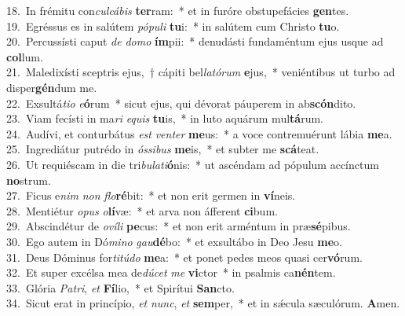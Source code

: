{18.~}In frémitu con\textit{cul}\textit{cá}\textit{bis} \textbf{ter}ram:~* et in furóre obstupefácies \textbf{gen}tes.\\
{19.~}Egréssus es in salútem \textit{pó}\textit{pu}\textit{li} \textbf{tu}i:~* in salútem cum Christo \textbf{tu}o.\\
{20.~}Percussísti caput \textit{de} \textit{do}\textit{mo} \textbf{ím}pii:~* denudásti fundaméntum ejus usque ad \textbf{col}lum.\\
{21.~}Maledixísti sceptris ejus,~† cápiti bel\textit{la}\textit{tó}\textit{rum} \textbf{e}jus,~* veniéntibus ut turbo ad disper\textbf{gén}dum me.\\
{22.~}Exsultá\textit{ti}\textit{o} \textit{e}\textbf{ó}rum~* sicut ejus, qui dévorat páuperem in ab\textbf{scón}dito.\\
{23.~}Viam fecísti in ma\textit{ri} \textit{e}\textit{quis} \textbf{tu}is,~* in luto aquárum mul\textbf{tá}rum.\\
{24.~}Audívi, et conturbátus \textit{est} \textit{ven}\textit{ter} \textbf{me}us:~* a voce contremuérunt lábia \textbf{me}a.\\
{25.~}Ingrediátur putrédo in \textit{ós}\textit{si}\textit{bus} \textbf{me}is,~* et subter me \textbf{scá}teat.\\
{26.~}Ut requiéscam in die tri\textit{bu}\textit{la}\textit{ti}\textbf{ó}nis:~* ut ascéndam ad pópulum accínctum \textbf{no}strum.\\
{27.~}Ficus e\textit{nim} \textit{non} \textit{flo}\textbf{ré}bit:~* et non erit germen in \textbf{ví}neis.\\
{28.~}Mentiétur \textit{o}\textit{pus} \textit{o}\textbf{lí}væ:~* et arva non áfferent \textbf{ci}bum.\\
{29.~}Abscindétur de \textit{o}\textit{ví}\textit{li} \textbf{pe}cus:~* et non erit arméntum in præ\textbf{sé}pibus.\\
{30.~}Ego autem in Dó\textit{mi}\textit{no} \textit{gau}\textbf{dé}bo:~* et exsultábo in Deo Jesu \textbf{me}o.\\
{31.~}Deus Dóminus for\textit{ti}\textit{tú}\textit{do} \textbf{me}a:~* et ponet pedes meos quasi cer\textbf{vó}rum.\\
{32.~}Et super excélsa mea de\textit{dú}\textit{cet} \textit{me} \textbf{vi}ctor~* in psalmis ca\textbf{nén}tem.\\
{33.~}Glória \textit{Pa}\textit{tri}, \textit{et} \textbf{Fí}lio,~* et Spirítui \textbf{San}cto.\\
{34.~}Sicut erat in princípio, \textit{et} \textit{nunc}, \textit{et} \textbf{sem}per,~* et in sǽcula sæculórum. \textbf{A}men.\\
